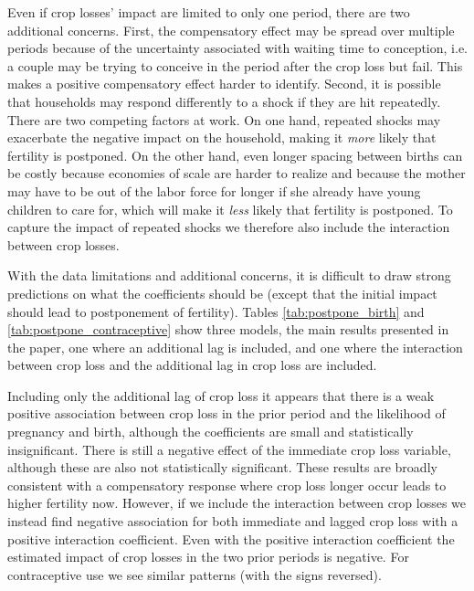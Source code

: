 \documentclass[letterpaper,12pt]{article}
\begin{document}
Even if crop losses' impact are limited to only one period, there 
are two additional concerns.
First, the compensatory effect may be spread over multiple 
periods because of the uncertainty associated with waiting time
to conception, i.e. a couple may be trying to conceive in the
period after the crop loss but fail.
This makes a positive compensatory effect harder to 
identify.
Second, it is possible that households may respond differently to a 
shock if they are hit repeatedly.
There are two competing factors at work.
On one hand, repeated shocks may exacerbate the negative impact on the
household, making it \emph{more} likely that fertility is postponed.
On the other hand, even longer spacing between births can be costly 
because economies of scale are harder to realize and because the 
mother may have to  be out of the labor force for longer if she 
already have young children to care for, which will make it
\emph{less} likely that fertility is postponed.
To capture the impact of repeated shocks we therefore also 
include the interaction between crop losses.






With the data limitations and additional concerns,
it is difficult to draw strong predictions on what the coefficients
should be (except that the initial impact should lead to postponement 
of fertility).
Tables \ref{tab:postpone_birth} and \ref{tab:postpone_contraceptive}
show three models, the main results presented in the paper, one
where an additional lag is included, and one where the interaction
between crop loss and the additional lag in crop loss are included.

Including only the additional lag of crop loss it appears that 
there is a weak positive association between crop loss in the prior
period and the likelihood of pregnancy and birth, although the 
coefficients are small and statistically insignificant.
There is still a negative effect of the immediate crop loss
variable, although these are also not statistically significant.
These results are broadly consistent with a compensatory response
where crop loss longer occur leads to higher fertility now.
However, if we include the interaction between crop losses we 
instead find negative association for both immediate and lagged 
crop loss with a positive interaction coefficient.
Even with the positive interaction coefficient the estimated 
impact of crop losses in the two prior periods is negative.
For contraceptive use we see similar patterns (with the signs 
reversed).
\end{document}
